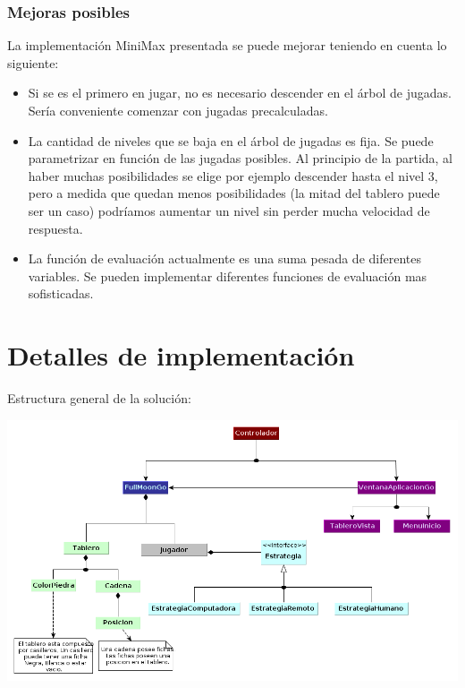 \documentclass[11pt]{article}
\begin{document}
\subsubsection{Mejoras posibles}

   La implementaci\'on MiniMax presentada se puede mejorar teniendo en
   cuenta lo siguiente:

   \begin{itemize}
     \item Si se es el primero en jugar, no es necesario descender en
       el \'arbol de jugadas. Ser\'ia conveniente comenzar con jugadas
       precalculadas.
     \item La cantidad de niveles que se baja en el \'arbol de jugadas
       es fija. Se puede parametrizar en funci\'on de las jugadas
       posibles. Al principio de la partida, al haber muchas
       posibilidades se elige por ejemplo descender hasta el nivel 3,
       pero a medida que quedan menos posibilidades (la mitad del
       tablero puede ser un caso) podr\'iamos aumentar un nivel sin
       perder mucha velocidad de respuesta.
     \item La funci\'on de evaluaci\'on actualmente es una suma pesada
       de diferentes variables. Se pueden implementar diferentes
       funciones de evaluaci\'on mas sofisticadas.
   \end{itemize}

\newpage
\section{Detalles de implementación}
\label{sec-4}

Estructura general de la soluci\'on:

\begin{center}
 \includegraphics[scale=0.55]{./Diagramas/DiagramaClases/diagrama_de_clases.png}
\end{center}
\end{document}

